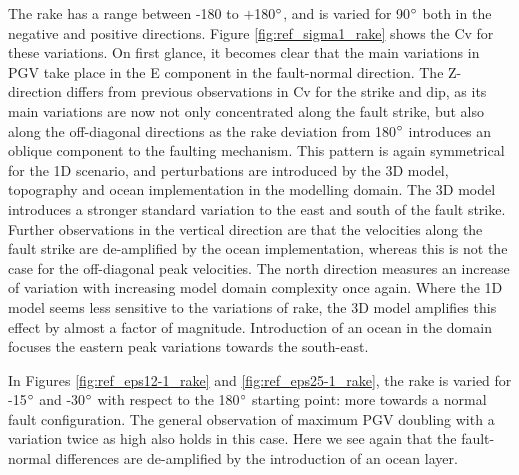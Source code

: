 \documentclass[../Text/00main.tex]{subfiles}
\begin{document}
The rake has a range between -180 to $+$180$\degree$, and is varied for 90$\degree$ both in the negative and positive directions. Figure \ref{fig:ref_sigma1_rake} shows the $\text{Cv}$ for these variations. On first glance, it becomes clear that the main variations in PGV take place in the E component in the fault-normal direction. The Z-direction differs from previous observations in $\text{Cv}$ for the strike and dip, as its main variations are now not only concentrated along the fault strike, but also along the off-diagonal directions as the rake deviation from 180$\degree$ introduces an oblique component to the faulting mechanism. This pattern is again symmetrical for the 1D scenario, and perturbations are introduced by the 3D model, topography and ocean implementation in the modelling domain. The 3D model introduces a stronger standard variation to the east and south of the fault strike. Further observations in the vertical direction are that the velocities along the fault strike are de-amplified by the ocean implementation, whereas this is not the case for the off-diagonal peak velocities. The north direction measures an increase of variation with increasing model domain complexity once again. Where the 1D model seems less sensitive to the variations of rake, the 3D model amplifies this effect by almost a factor of magnitude. Introduction of an ocean in the domain focuses the eastern peak variations towards the south-east. 

In Figures \ref{fig:ref_eps12-1_rake} and \ref{fig:ref_eps25-1_rake}, the rake is varied for -15$\degree$ and -30$\degree$ with respect to the 180$\degree$ starting point: more towards a normal fault configuration. The general observation of maximum PGV doubling with a variation twice as high also holds in this case. Here we see again that the fault-normal differences are de-amplified by the introduction of an ocean layer. 
\end{document}
